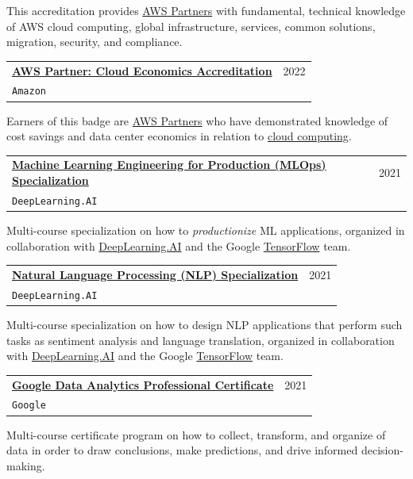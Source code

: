 \documentclass[letterpaper,11pt]{article}
\makeatletter
\newcommand{\resumeSubheading}[4]{
  \vspace{-2pt}\item
    \begin{tabular*}{0.97\textwidth}[t]{l@{\extracolsep{\fill}}r}
      \textbf{#1} & #2 \\
      \texttt{\small#3} & \textit{\small #4} \\
    \end{tabular*}\vspace{-7pt}
}
\makeatother
\begin{document}
    This accreditation provides \href{https://aws.amazon.com/partners/}{AWS Partners} with fundamental, technical knowledge of AWS cloud computing, global infrastructure, services, common solutions, migration, security, and compliance.
    
    \vspace{2mm}
    \resumeSubheading
      {\href{https://aws.amazon.com/partners/training/accreditation/}{AWS Partner: Cloud Economics Accreditation}}{2022}
      {Amazon}{}
    \vspace{2mm}
    
    Earners of this badge are \href{https://aws.amazon.com/partners/}{AWS Partners} who have demonstrated knowledge of cost savings and data center economics in relation to \href{https://aws.amazon.com/economics/}{cloud computing}.
    
    \vspace{2mm}
    \resumeSubheading
      {\href{https://www.coursera.org/specializations/machine-learning-engineering-for-production-mlops}{Machine Learning Engineering for Production (MLOps) Specialization}}{2021}
      {DeepLearning.AI}{}
    \vspace{2mm}
    
    Multi-course specialization on how to \emph{productionize} ML applications, organized in collaboration with \href{https://www.deeplearning.ai/}{DeepLearning.AI} and the Google \href{https://www.tensorflow.org/}{TensorFlow} team.
    
    \vspace{2mm}
    \resumeSubheading
      {\href{https://www.coursera.org/specializations/natural-language-processing}{Natural Language Processing (NLP) Specialization}}{2021}
      {DeepLearning.AI}{}
    \vspace{2mm}
    
    Multi-course specialization on how to design NLP applications that perform such tasks as sentiment analysis and language translation, organized in collaboration with \href{https://www.deeplearning.ai/}{DeepLearning.AI} and the Google \href{https://www.tensorflow.org/}{TensorFlow} team.
    
    \vspace{2mm}
    \resumeSubheading
      {\href{https://grow.google/dataanalytics}{Google Data Analytics Professional Certificate}}{2021}
      {Google}{}
    \vspace{2mm}
    
    Multi-course certificate program on how to collect, transform, and organize of data in order to draw conclusions, make predictions, and drive informed decision-making.
    
\end{document}
